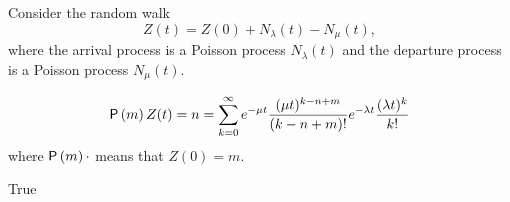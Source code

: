 \begin{exercise}[201703] 
  Consider the random walk
\begin{equation*}
  Z(t) = Z(0) + N_\lambda(t) - N_\mu(t), 
\end{equation*}
where the arrival process is a Poisson process $N_\lambda(t)$ and the
departure process is a Poisson process $N_\mu(t)$. 

\begin{equation*}
  \begin{split}
    \P{m}{Z(t)=n} 
&= \sum_{k=0}^\infty e^{-\mu t} \frac{(\mu t)^{k -n+m}}{(k-n +m)!} e^{-\lambda t} \frac{(\lambda t)^k}{k!} \\
  \end{split}
\end{equation*}
where $\P{m}{\cdot}$ means that $Z(0)=m$.

  \begin{solution}
    True
  \end{solution}
\end{exercise}


